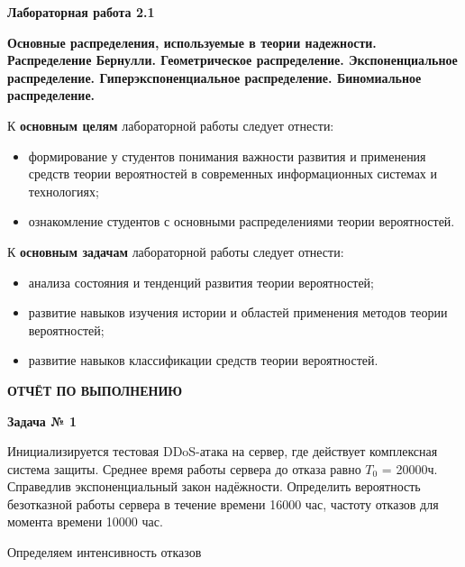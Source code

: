 
\graphicspath{ {2.1/models/} }
\usepackage{hyperref}
\usepackage{upgreek}

\pagestyle{fancy}
\fancyhead{}
\renewcommand{\headrulewidth}{0pt}


\begin{center}
    \textbf{Лабораторная работа 2.1}

    \textbf{Основные распределения, используемые в
теории надежности. Распределение Бернулли. Геометрическое
распределение. Экспоненциальное распределение.
Гиперэкспоненциальное распределение. Биномиальное распределение.}
\end{center}

К \textbf{основным целям} лабораторной работы следует отнести:

\begin{itemize}
    \item формирование у студентов понимания важности развития и применения средств теории вероятностей в современных информационных системах и технологиях;
    \item ознакомление студентов с основными распределениями теории вероятностей.
\end{itemize}

К \textbf{основным задачам} лабораторной работы следует отнести:

\begin{itemize}
    \item анализа состояния и тенденций развития теории вероятностей;
    \item развитие навыков изучения истории и областей применения методов теории вероятностей;
    \item развитие навыков классификации средств теории вероятностей.
\end{itemize}
\bigskip

\pagebreak

\begin{center}
\textbf{ОТЧЁТ ПО ВЫПОЛНЕНИЮ}
\end{center}

\textbf{Задача № 1}

Инициализируется тестовая DDoS-атака на сервер, где действует комплексная
система защиты. Среднее время работы сервера до отказа равно $T_0$ = 20000ч.
Справедлив экспоненциальный закон надёжности. Определить вероятность
безотказной работы сервера в течение времени 16000 час, частоту отказов для
момента времени 10000 час.

Определяем интенсивность отказов

